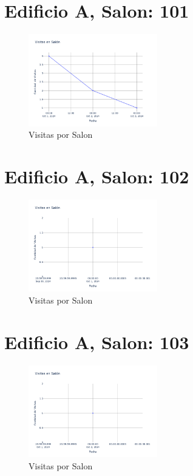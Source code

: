 \documentclass{article}
\begin{document}
    \section{Edificio A, Salon: 101}
    \begin{figure}
        \centering
        \includegraphics[width=0.5\textwidth]{../img/poli/VS101-90Dias-03-12-2024.png}
        \caption{Visitas por Salon}
    \end{figure}

    

    \section{Edificio A, Salon: 102}
    \begin{figure}
        \centering
        \includegraphics[width=0.5\textwidth]{../img/poli/VS102-90Dias-03-12-2024.png}
        \caption{Visitas por Salon}
    \end{figure}

    

    \section{Edificio A, Salon: 103}
    \begin{figure}
        \centering
        \includegraphics[width=0.5\textwidth]{../img/poli/VS103-90Dias-03-12-2024.png}
        \caption{Visitas por Salon}
    \end{figure}
\end{document}
